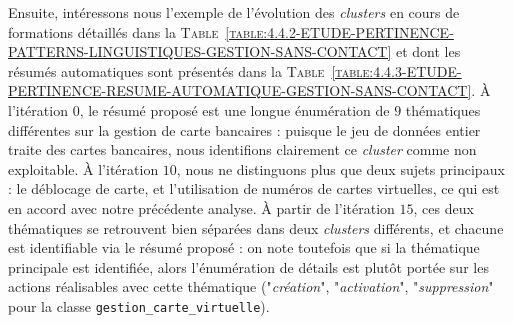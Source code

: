 			Ensuite, intéressons nous l'exemple de l'évolution des \textit{clusters} en cours de formations détaillés dans la \textsc{Table~\ref{table:4.4.2-ETUDE-PERTINENCE-PATTERNS-LINGUISTIQUES-GESTION-SANS-CONTACT}} et dont les résumés automatiques sont présentés dans la \textsc{Table~\ref{table:4.4.3-ETUDE-PERTINENCE-RESUME-AUTOMATIQUE-GESTION-SANS-CONTACT}}.
			À l'itération $0$, le résumé proposé est une longue énumération de $9$ thématiques différentes sur la gestion de carte bancaires : puisque le jeu de données entier traite des cartes bancaires, nous identifions clairement ce \textit{cluster} comme non exploitable.
			À l'itération $10$, nous ne distinguons plus que deux sujets principaux : le déblocage de carte, et l'utilisation de numéros de cartes virtuelles, ce qui est en accord avec notre précédente analyse.
			À partir de l'itération $15$, ces deux thématiques se retrouvent bien séparées dans deux \textit{clusters} différents, et chacune est identifiable via le résumé proposé : on note toutefois que si la thématique principale est identifiée, alors l'énumération de détails est plutôt portée sur les actions réalisables avec cette thématique ("\textit{création}", "\textit{activation}", "\textit{suppression}" pour la classe \texttt{gestion\_carte\_virtuelle}).
